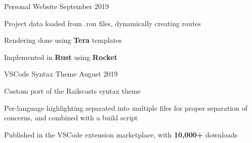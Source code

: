 

\begin{cventries}
    \cventry
    {Personal Website} %
    {} %
    {}{September 2019}{
        \begin{cvitems} %
            \item {Project data loaded from .ron files, dynamically creating routes}
            \item {Rendering done using \textbf{Tera} templates}
            \item {Implemented in \textbf{Rust} using \textbf{Rocket}}
        \end{cvitems}
    }

    \cventry
    {VSCode Syntax Theme} %
    {} %
    {}{August 2019}{
        \begin{cvitems} %
            \item {Custom port of the Railscasts syntax theme}
            \item {Per-language highlighting separated into multiple files for proper separation of concerns, and combined with a build script}
            \item {Published in the VSCode extension marketplace, with \textbf{10,000+} downloads}
        \end{cvitems}
    }



\end{cventries}
